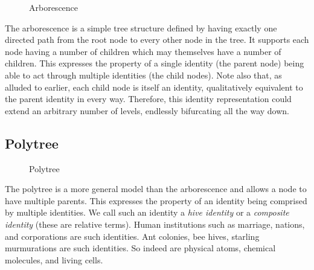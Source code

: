 \documentclass[pra,twocolumn,groupedaddress,10pt]{revtex4}
\theoremstyle{definition}
\begin{document}
\begin{figure}[htp]
\centering
{}
\caption{\label{fig:arborescence}Arborescence}
\end{figure}

The arborescence\cite{arborescence} is a simple tree structure defined by having exactly one directed path from the root node to every other node in the tree. It supports each node having a number of children which may themselves have a number of children. This expresses the property of a single identity (the parent node) being able to act through multiple identities (the child nodes). Note also that, as alluded to earlier, each child node is itself an identity, qualitatively equivalent to the parent identity in every way. Therefore, this identity representation could extend an arbitrary number of levels, endlessly bifurcating all the way down.

\subsection{Polytree} \label{sec:polytree}

\begin{figure}[htp]
\centering
{}
\caption{\label{fig:polytree}Polytree}
\end{figure}

The polytree\cite{polytree} is a more general model than the arborescence and allows a node to have multiple parents. This expresses the property of an identity being comprised by multiple identities. We call such an identity a \textit{hive identity} or a \textit{composite identity} (these are relative terms). Human institutions such as marriage, nations, and corporations are such identities. Ant colonies, bee hives, starling murmurations are such identities. So indeed are physical atoms, chemical molecules, and living cells.
\end{document}
